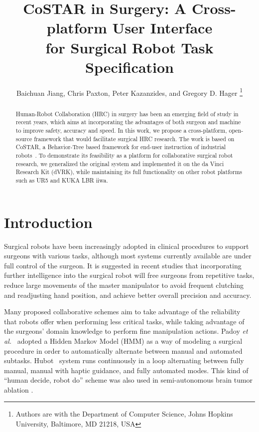 \documentclass[letterpaper, 10 pt, conference]{ieeeconf}
\title{\huge \bf
CoSTAR in Surgery: A Cross-platform User Interface \\for Surgical Robot Task Specification
}
\author{Baichuan Jiang, Chris Paxton, Peter Kazanzides, and Gregory D. Hager
\thanks{Authors are with the Department of Computer Science, Johns Hopkins University,
        Baltimore, MD 21218, USA}
}
\begin{document}
\maketitle
\thispagestyle{empty}
\pagestyle{empty}


\newcommand{\fix}[1]{{\color{red} \textbf{[FIX: #1]}}}
\newcommand{\todo}[2]{{\color{blue} \textbf{[TODO(#1): #2]}}}

\begin{abstract}

Human-Robot Collaboration (HRC) in surgery has been an emerging field of study in recent years, which aims at incorporating the advantages of both surgeon and machine to improve safety, accuracy and speed. In this work, we propose a cross-platform, open-source framework that would facilitate surgical HRC research. The work is based on CoSTAR, a Behavior-Tree based framework for end-user instruction of industrial robots~\cite{paxton2017costar}. To demonstrate its feasibility as a platform for collaborative surgical robot research, we generalized the original system and implemented it on the da Vinci Research Kit (dVRK), while maintaining its full functionality on other robot platforms such as UR5 and KUKA LBR iiwa.  

\end{abstract}


\section{Introduction}

Surgical robots have been increasingly adopted in clinical procedures to support surgeons with various tasks, although most systems currently available are under full control of the surgeon. It is suggested in recent studies \cite{padoy2011human,berthet2016hubot,bauzano2016collaborative,hu2015semi} that incorporating further intelligence into the surgical robot will free surgeons from repetitive tasks, reduce large movements of the master manipulator to avoid frequent clutching and readjusting hand position, and achieve better overall precision and accuracy. 

Many proposed collaborative schemes aim to take advantage of the reliability that robots offer when performing less critical tasks, while taking advantage of the surgeons' domain knowledge to perform fine manipulation actions. Padoy \textit{et al.}~\cite{padoy2011human} adopted a Hidden Markov Model (HMM) as a way of modeling a surgical procedure in order to automatically alternate between manual and automated subtasks. Hubot~\cite{berthet2016hubot} system runs continuously in a loop alternating between fully manual, manual with haptic guidance, and fully automated modes. This kind of ``human decide, robot do'' scheme was also used in semi-autonomous brain tumor ablation \cite{hu2015semi}.
\end{document}
